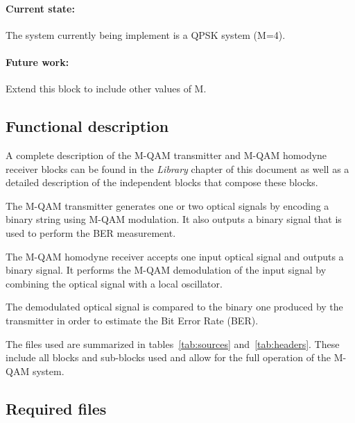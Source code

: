 \paragraph{Current state:} The system currently being implement is a QPSK system (M=4).

\paragraph{Future work:} Extend this block to include other values of M.

\subsection*{Functional description}

A complete description of the M-QAM transmitter and M-QAM homodyne receiver blocks can be found in the \textit{Library} chapter of this document as well as a detailed description of the independent blocks that compose these blocks.

The M-QAM transmitter generates one or two optical signals by encoding a binary string using M-QAM modulation. It also outputs a binary signal that is used to perform the BER measurement.

The M-QAM homodyne receiver accepts one input optical signal and outputs
a binary signal. It performs the M-QAM demodulation of the input signal by combining the optical signal with a local oscillator.

The demodulated optical signal is compared to the binary one produced by the transmitter in order to estimate the Bit Error Rate (BER).

The files used are summarized in tables~\ref{tab:sources} and~\ref{tab:headers}. These include all blocks and sub-blocks used and allow for the full operation of the M-QAM system.

\subsection*{Required files}\label{Required files}

